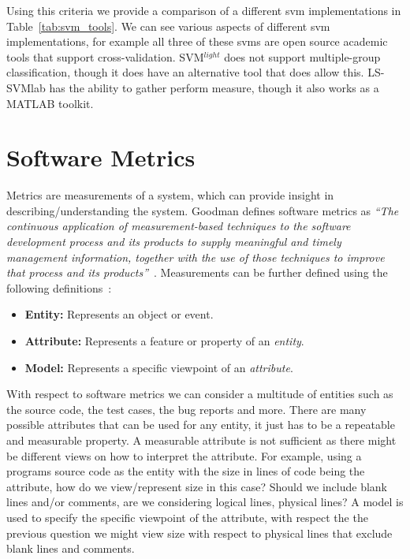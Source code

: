 Using this criteria we provide a comparison of a different \gls{svm} implementations in Table~\ref{tab:svm_tools}. We can see various aspects of different \gls{svm} implementations, for example all three of these \gls{svm}s are open source academic tools that support cross-validation. SVM$^{light}$ does not support multiple-group classification, though it does have an alternative tool that does allow this. LS-SVMlab has the ability to gather perform measure, though it also works as a MATLAB toolkit.


\section{Software Metrics}
\label{sec:background_metrics}
Metrics are measurements of a system, which can provide insight in describing/understanding the system. Goodman defines software metrics as \emph{``The continuous application of measurement-based techniques to the software development process and its products to supply meaningful and timely management information, together with the use of those techniques to improve that process and its products''}~\cite{Goo93}. Measurements can be further defined using the following definitions~\cite{Fen94}:

\begin{itemize}
  \item \textbf{Entity:} Represents an object or event.
  \item \textbf{Attribute:} Represents a feature or property of an \emph{entity}.
  \item \textbf{Model:} Represents a specific viewpoint of an \emph{attribute}.
\end{itemize}

With respect to software metrics we can consider a multitude of entities such as the source code, the test cases, the bug reports and more. There are many possible attributes that can be used for any entity, it just has to be a repeatable and measurable property. A measurable attribute is not sufficient as there might be different views on how to interpret the attribute. For example, using a programs source code as the entity with the size in lines of code being the attribute, how do we view/represent size in this case? Should we include blank lines and/or comments, are we considering logical lines, physical lines? A model is used to specify the specific viewpoint of the attribute, with respect the the previous question we might view size with respect to physical lines that exclude blank lines and comments.

